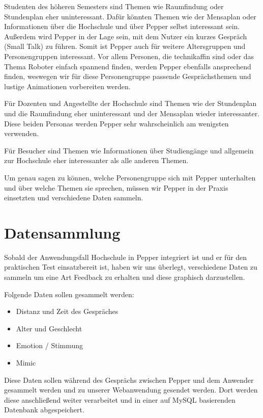 Studenten des höheren Semesters sind Themen wie Raumfindung oder Stundenplan eher uninteressant. Dafür könnten Themen wie der Mensaplan oder Informationen über die Hochschule und über Pepper selbst interessant sein. Außerdem wird Pepper in der Lage sein, mit dem Nutzer ein kurzes Gespräch (Small Talk) zu führen. Somit ist Pepper auch für weitere Altersgruppen und Personengruppen interessant. Vor allem Personen, die technikaffin sind oder das Thema Roboter einfach spannend finden, werden Pepper ebenfalls ansprechend finden, weswegen wir für diese Personengruppe passende Gesprächsthemen und lustige Animationen vorbereiten werden.

Für Dozenten und Angestellte der Hochschule sind Themen wie der Stundenplan und die Raumfindung eher uninteressant und der Mensaplan wieder interessanter. Diese beiden Personas werden Pepper sehr wahrscheinlich am wenigsten verwenden.

Für Besucher sind Themen wie Informationen über Studiengänge und allgemein zur Hochschule eher interessanter als alle anderen Themen.

Um genau sagen zu können, welche Personengruppe sich mit Pepper unterhalten und über welche Themen sie sprechen, müssen wir Pepper in der Praxis einsetzten und verschiedene Daten sammeln.\\


\section{Datensammlung}
Sobald der Anwendungsfall Hochschule in Pepper integriert ist und er für den praktischen Test einsatzbereit ist, haben wir uns überlegt, verschiedene Daten zu sammeln um eine Art Feedback zu erhalten und diese graphisch darzustellen.

Folgende Daten sollen gesammelt werden:
\begin{itemize}
    \item Distanz und Zeit des Gespräches
    \item Alter und Geschlecht
    \item Emotion / Stimmung
    \item Mimic
\end{itemize}

Diese Daten sollen während des Gesprächs zwischen Pepper und dem Anwender gesammelt werden und zu unserer Webanwendung gesendet werden. Dort werden diese anschließend weiter verarbeitet und in einer auf MySQL basierenden Datenbank abgespeichert.

